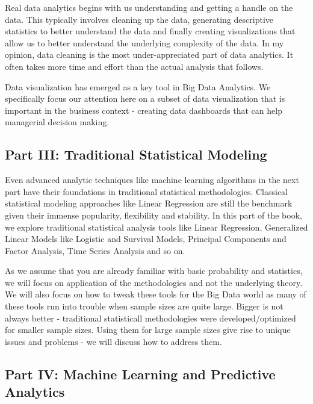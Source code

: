 \documentclass[]{krantz}
\theoremstyle{definition}
\theoremstyle{definition}
\theoremstyle{definition}
\theoremstyle{remark}
\begin{document}
Real data analytics begins with us understanding and getting a handle on
the data. This typically involves cleaning up the data, generating
descriptive statistics to better understand the data and finally
creating visualizations that allow us to better understand the
underlying complexity of the data. In my opinion, data cleaning is the
most under-appreciated part of data analytics. It often takes more time
and effort than the actual analysis that follows.

Data visualization has emerged as a key tool in Big Data Analytics. We
specifically focus our attention here on a subset of data visualization
that is important in the business context - creating data dashboards
that can help managerial decision making.

\subsection*{Part III: Traditional Statistical
Modeling}\label{part-iii-traditional-statistical-modeling}

Even advanced analytic techniques like machine learning algorithms in
the next part have their foundations in traditional statistical
methodologies. Classical statistical modeling approaches like Linear
Regression are still the benchmark given their immense popularity,
flexibility and stability. In this part of the book, we explore
traditional statistical analysis tools like Linear Regression,
Generalized Linear Models like Logistic and Survival Models, Principal
Components and Factor Analysis, Time Series Analysis and so on.

As we assume that you are already familiar with basic probability and
statistics, we will focus on application of the methodologies and not
the underlying theory. We will also focus on how to tweak these tools
for the Big Data world as many of these tools run into trouble when
sample sizes are quite large. Bigger is not always better - traditional
statisticall methodologies were developed/optimized for smaller sample
sizes. Using them for large sample sizes give rise to unique issues and
problems - we will discuss how to address them.

\subsection*{Part IV: Machine Learning and Predictive
Analytics}\label{part-iv-machine-learning-and-predictive-analytics}
\end{document}
